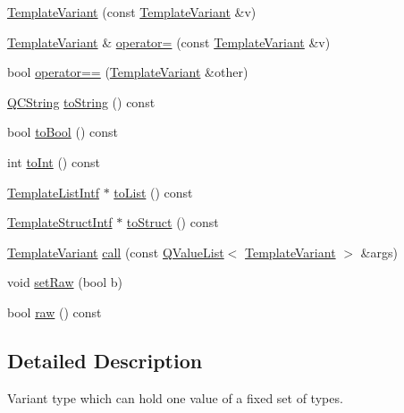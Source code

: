 \begin{DoxyCompactItemize}
\item 
\mbox{\hyperlink{class_template_variant_ad9594af6ca3e9f1f2688ac4f03fe106c}{Template\+Variant}} (const \mbox{\hyperlink{class_template_variant}{Template\+Variant}} \&v)
\item 
\mbox{\hyperlink{class_template_variant}{Template\+Variant}} \& \mbox{\hyperlink{class_template_variant_a113fe73f8110597f42969c431385aa19}{operator=}} (const \mbox{\hyperlink{class_template_variant}{Template\+Variant}} \&v)
\item 
bool \mbox{\hyperlink{class_template_variant_a8bb71720af66556958d79aa6c64f559b}{operator==}} (\mbox{\hyperlink{class_template_variant}{Template\+Variant}} \&other)
\item 
\mbox{\hyperlink{class_q_c_string}{Q\+C\+String}} \mbox{\hyperlink{class_template_variant_ab03869d8a226d83614fca23902b0facd}{to\+String}} () const
\item 
bool \mbox{\hyperlink{class_template_variant_a208563a3d54212cc15b4316a3c61e165}{to\+Bool}} () const
\item 
int \mbox{\hyperlink{class_template_variant_a477cb7cb81a98abb837c414c3216ec58}{to\+Int}} () const
\item 
\mbox{\hyperlink{class_template_list_intf}{Template\+List\+Intf}} $\ast$ \mbox{\hyperlink{class_template_variant_a96c0c47020c05b88b1ad1dfc2b6961e2}{to\+List}} () const
\item 
\mbox{\hyperlink{class_template_struct_intf}{Template\+Struct\+Intf}} $\ast$ \mbox{\hyperlink{class_template_variant_a999df05d683cfea696903ae116cb9fcc}{to\+Struct}} () const
\item 
\mbox{\hyperlink{class_template_variant}{Template\+Variant}} \mbox{\hyperlink{class_template_variant_aa36e21ae53656963fd75b799e4fd0808}{call}} (const \mbox{\hyperlink{class_q_value_list}{Q\+Value\+List}}$<$ \mbox{\hyperlink{class_template_variant}{Template\+Variant}} $>$ \&args)
\item 
void \mbox{\hyperlink{class_template_variant_a3ca5dec8397f15321f13085ee5fefcc1}{set\+Raw}} (bool b)
\item 
bool \mbox{\hyperlink{class_template_variant_a17a2ee68f05645c2da3180259f12953a}{raw}} () const
\end{DoxyCompactItemize}


\subsection{Detailed Description}
Variant type which can hold one value of a fixed set of types. 

